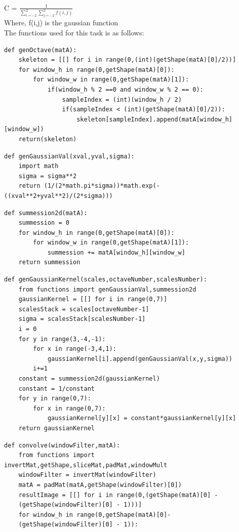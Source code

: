 \documentclass[12pt]{article}
\newenvironment{QandA}
{
	\begin{enumerate}[label=\normalfont\arabic*.,leftmargin=2em,rightmargin=2em]\normalfont
	}
	{
	\end{enumerate}
}
\newenvironment{codelalala}{}{}
\newenvironment{answered}{\setlength{\parindent}{1em}\par\normalfont}{}
\begin{document}
\begin{QandA}
\begin{answered}
\\
C = $\frac{1}{\sum_{i=-2}^{2}\sum_{j=-2}^{2}f(i,j)}$
\\
Where, f(i,j) is the gaussian function
\\
The functions used for this task is as follows:
\begin{codelalala}
\begin{verbatim}
def genOctave(matA):
    skeleton = [[] for i in range(0,(int)(getShape(matA)[0]/2))]
    for window_h in range(0,getShape(matA)[0]):
        for window_w in range(0,getShape(matA)[1]):
            if(window_h % 2 ==0 and window_w % 2 == 0):
                sampleIndex = (int)(window_h / 2)
                if(sampleIndex < (int)(getShape(matA)[0]/2)):
                    skeleton[sampleIndex].append(matA[window_h][window_w])
    return(skeleton)
\end{verbatim}
\begin{verbatim}
def genGaussianVal(xval,yval,sigma):
    import math
    sigma = sigma**2
    return (1/(2*math.pi*sigma))*math.exp(-((xval**2+yval**2)/(2*sigma)))
\end{verbatim}
\begin{verbatim}
def summession2d(matA):
    summession = 0
    for window_h in range(0,getShape(matA)[0]):
        for window_w in range(0,getShape(matA)[1]):
            summession += matA[window_h][window_w]
    return summession
\end{verbatim}
\begin{verbatim}
def genGaussianKernel(scales,octaveNumber,scalesNumber):
    from functions import genGaussianVal,summession2d
    gaussianKernel = [[] for i in range(0,7)]
    scalesStack = scales[octaveNumber-1]
    sigma = scalesStack[scalesNumber-1]
    i = 0
    for y in range(3,-4,-1):
        for x in range(-3,4,1):
            gaussianKernel[i].append(genGaussianVal(x,y,sigma))
        i+=1
    constant = summession2d(gaussianKernel)
    constant = 1/constant
    for y in range(0,7):
        for x in range(0,7):
            gaussianKernel[y][x] = constant*gaussianKernel[y][x] 
    return gaussianKernel
\end{verbatim}
\begin{verbatim}
def convolve(windowFilter,matA):
    from functions import invertMat,getShape,sliceMat,padMat,windowMult
    windowFilter = invertMat(windowFilter)
    matA = padMat(matA,getShape(windowFilter)[0])
    resultImage = [[] for i in range(0,(getShape(matA)[0] - 
    (getShape(windowFilter)[0] - 1)))]
    for window_h in range(0,getShape(matA)[0]-
    (getShape(windowFilter)[0] - 1)):

\end{verbatim}
\end{codelalala}
\end{answered}
\end{QandA}
\end{document}
